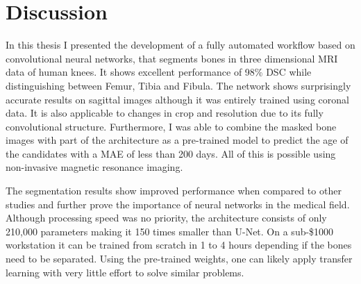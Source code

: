 \section{Discussion}

In this thesis I presented the development of a fully automated workflow based on convolutional neural networks, that segments bones in three dimensional MRI data of human knees. It shows excellent performance of 98\% DSC while distinguishing between Femur, Tibia and Fibula. The network shows surprisingly accurate results on sagittal images although it was entirely trained using coronal data. It is also applicable to changes in crop and resolution due to its fully convolutional structure. Furthermore, I was able to combine the masked bone images with part of the architecture as a pre-trained model to predict the age of the candidates with a MAE of less than 200 days. All of this is possible using non-invasive magnetic resonance imaging.

The segmentation results show improved performance when compared to other studies and further prove the importance of neural networks in the medical field. Although processing speed was no priority, the architecture consists of only 210,000 parameters making it 150 times smaller than U-Net. On a sub-\$1000 workstation it can be trained from scratch in 1 to 4 hours depending if the bones need to be separated. Using the pre-trained weights, one can likely apply transfer learning with very little effort to solve similar problems.

\newpage